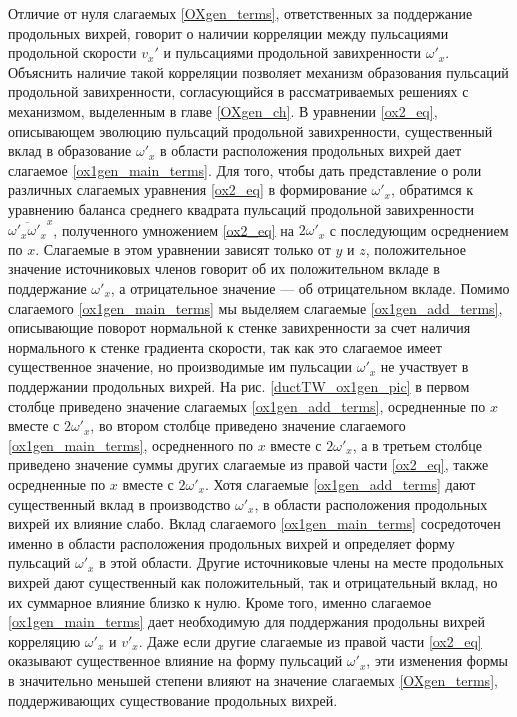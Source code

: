 Отличие от нуля слагаемых \eqref{OXgen_terms}, ответственных за поддержание продольных вихрей, говорит о наличии корреляции между пульсациями продольной скорости $v_x'$ и пульсациями продольной завихренности $\omega'_x$. Объяснить наличие такой корреляции позволяет механизм образования пульсаций продольной завихренности, согласующийся в рассматриваемых решениях с механизмом, выделенным в главе \ref{OXgen_ch}. В уравнении \eqref{ox2_eq}, описывающем эволюцию пульсаций продольной завихренности, существенный вклад в образование $\omega'_x$ в области расположения продольных вихрей дает слагаемое \eqref{ox1gen_main_terms}. Для того, чтобы дать представление о роли различных слагаемых уравнения \eqref{ox2_eq} в формирование $\omega'_x$, обратимся к уравнению баланса среднего квадрата пульсаций продольной завихренности $\overline{\omega'_x \omega'_x}^x$, полученного умножением \eqref{ox2_eq} на $2\omega'_x$ с последующим осреднением по $x$. Слагаемые в этом уравнении зависят только от $y$ и $z$, положительное значение источниковых членов говорит об их положительном вкладе в поддержание $\omega'_x$, а отрицательное значение --- об отрицательном вкладе. Помимо слагаемого \eqref{ox1gen_main_terms} мы выделяем слагаемые \eqref{ox1gen_add_terms}, описывающие поворот нормальной к стенке завихренности за счет наличия нормального к стенке градиента скорости, так как это слагаемое имеет существенное значение, но производимые им пульсации $\omega'_x$ не участвует в поддержании продольных вихрей. На рис. \ref{ductTW_ox1gen_pic} в первом столбце приведено значение слагаемых \eqref{ox1gen_add_terms}, осредненные по $x$ вместе с $2\omega'_x$, во втором столбце приведено значение слагаемого \eqref{ox1gen_main_terms}, осредненного по $x$ вместе с $2\omega'_x$, а в третьем столбце приведено значение суммы других слагаемые из правой части \eqref{ox2_eq}, также осредненные по $x$ вместе с $2\omega'_x$. Хотя слагаемые \eqref{ox1gen_add_terms} дают существенный вклад в производство $\omega'_x$, в области расположения продольных вихрей их влияние слабо. Вклад слагаемого \eqref{ox1gen_main_terms} сосредоточен именно в области расположения продольных вихрей и определяет форму пульсаций $\omega'_x$ в этой области. Другие источниковые члены на месте продольных вихрей дают существенный как положительный, так и отрицательный вклад, но их суммарное влияние близко к нулю. Кроме того, именно слагаемое \eqref{ox1gen_main_terms} дает необходимую для поддержания продольны вихрей корреляцию $\omega'_x$ и $v'_x$. Даже если другие слагаемые из правой части \eqref{ox2_eq} оказывают существенное влияние на форму пульсаций $\omega'_x$, эти изменения формы в значительно меньшей степени влияют на значение слагаемых \eqref{OXgen_terms}, поддерживающих существование продольных вихрей.

